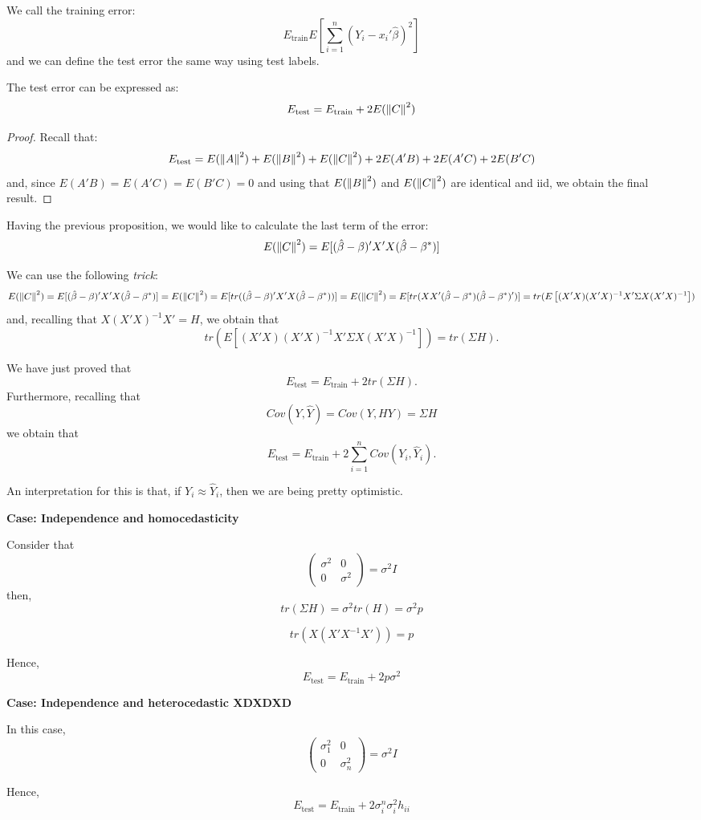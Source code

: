 \begin{ndef}
  We call the training error:
  \[
E_{\text{train}}E \left[\sum_{i=1}^{n}(Y_{i} - x_{i}'\hat \beta)^{2}\right]
\]
and we can define the test error the same way using test labels.
\end{ndef}

\begin{nprop}
  The test error can be expressed as:
  \[
    E_{\text{test}} = E_{\text{train}} + 2E(\left\lVert C\right\rVert^2)
    \]

  \end{nprop}
  \begin{proof}
    Recall that:
  \[
E_{\text{test}} = E(\left\lVert A\right\rVert^{2}) + E(\left\lVert B\right\rVert^{2}) + E(\left\lVert C\right\rVert^{2}) + 2E(A'B) + 2E(A'C) + 2E(B'C)
\]
and, since \(E(A'B) = E(A'C) = E(B'C) = 0\) and using that \(E(\left\lVert B\right\rVert^{2})\) and \(E(\left\lVert C\right\rVert^{2})\) are identical and iid, we obtain the final result.
\end{proof}

Having the previous proposition, we would like to calculate the last term of the error:
\[
E(\left\lVert C\right\rVert^{2}) = E[(\hat \beta - \beta)' X'X(\hat \beta - \beta^{*})]
\]

We can use the following \emph{trick}:
\[
E(\left\lVert C\right\rVert^{2}) = E[(\hat \beta - \beta)' X'X(\hat \beta - \beta^{*})] = E(\left\lVert C\right\rVert^{2}) = E[tr((\hat \beta - \beta)' X'X(\hat \beta - \beta^{*}))] = E(\left\lVert C\right\rVert^{2}) = E[tr(XX'(\hat \beta - \beta^{*})(\hat \beta - \beta^{*})')] = tr(E\left[ (X'X)(X'X)^{-1} X'\Sigma X (X'X)^{-1}\right])
\]
and, recalling that \(X(X'X)^{-1}X' = H\), we obtain that
\[
 tr(E\left[ (X'X)(X'X)^{-1} X'\Sigma X (X'X)^{-1}\right]) = tr(\Sigma H).
\]

We have just proved that
\[
E_{\text{test}} = E_{\text{train}} + 2tr(\Sigma H).
\]
Furthermore, recalling that
\[
Cov(Y,\hat Y) = Cov(Y,HY) = \Sigma H
\]
we obtain that
\[
E_{\text{test}} = E_{\text{train}} + 2 \sum_{i=1}^{n}Cov(Y_{i},\hat Y_{i}).
\]

An interpretation for this is that, if \(Y_{i} \approx \hat Y_{i}\), then we are being pretty optimistic.

\textbf{Case: Independence and homocedasticity }

Consider that
\[
\begin{pmatrix} \sigma^{2} & 0 \\ 0 & \sigma^{2} \end{pmatrix} = \sigma^{2} I
\]
then,
\[
  tr(\Sigma H) = \sigma^{2} tr(H) = \sigma^{2}p
\]

\[
tr(X(X'X^{-1}X')) = p
\]

Hence,
\[
E_{\text{test}} = E_{\text{train}} + 2p\sigma^{2}
\]


\textbf{Case: Independence and heterocedastic XDXDXD}

In this case,
\[
\begin{pmatrix} \sigma_{1}^{2} & 0 \\ 0 & \sigma_{n}^{2} \end{pmatrix} = \sigma^{2} I
\]

Hence,
\[
E_{\text{test}} = E_{\text{train}} + 2\sigma_{i}^{n}\sigma_{i}^{2} h_{ii}
\]


